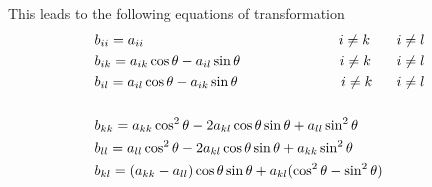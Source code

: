 \documentclass[%
reprint,
amsmath, 
amssymb, 
aps,]{revtex4-1}
\begin{document}
\vspace{2mm}
\noindent
This leads to the following equations of transformation \vspace{1mm}
			\begin{align*}
&b_{ii} = a_{ii} \hspace{49mm} i\not=k & i\not=l\\
&b_{ik} = a_{ik}\cos\theta -a_{il}\sin\theta \hspace{25mm} i\not=k & i\not=l \\
&b_{il}  = a_{il}\cos\theta -a_{ik}\sin\theta \hspace{26mm} i\not=k & i\not=l\\ &&\\
&b_{kk} = a_{kk}\cos^2\theta -2a_{kl}\cos\theta\sin\theta +a_{ll}\sin^2\theta&\\
&b_{ll} = a_{ll}\cos^2\theta -2a_{kl}\cos\theta\sin\theta +a_{kk}\sin^2\theta& \\
&b_{kl} = (a_{kk}-a_{ll})\cos\theta\sin\theta+a_{kl}(\cos^2\theta -\sin^2\theta)& \\
			\end{align*}
			\begin{equation}
	\label{jacobimethod}
			\end{equation}
\end{document}
